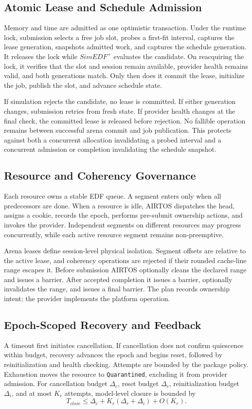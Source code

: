 \documentclass[lettersize,journal]{IEEEtran}
\begin{document}
\subsection{Atomic Lease and Schedule Admission}
Memory and time are admitted as one optimistic transaction. Under the runtime
lock, submission selects a free job slot, probes a first-fit interval, captures
the lease generation, snapshots admitted work, and captures the schedule
generation. It releases the lock while $SimEDF^+$ evaluates the candidate. On
reacquiring the lock, it verifies that the slot and session remain available,
provider health remains valid, and both generations match. Only then does it
commit the lease, initialize the job, publish the slot, and advance schedule
state.

If simulation rejects the candidate, no lease is committed. If either
generation changes, submission retries from fresh state. If provider health
changes at the final check, the committed lease is released before rejection.
No fallible operation remains between successful arena commit and job
publication. This protects against both a concurrent allocation invalidating a
probed interval and a concurrent admission or completion invalidating the
schedule snapshot.

\subsection{Resource and Coherency Governance}
Each resource owns a stable EDF queue. A segment enters only when all
predecessors are done. When a resource is idle, AIRTOS dispatches the head,
assigns a cookie, records the epoch, performs pre-submit ownership actions, and
invokes the provider. Independent segments on different resources may progress
concurrently, while each active resource segment remains non-preemptive.

Arena leases define session-level physical isolation. Segment offsets are
relative to the active lease, and coherency operations are rejected if their
rounded cache-line range escapes it. Before submission AIRTOS optionally cleans
the declared range and issues a barrier. After accepted completion it issues a
barrier, optionally invalidates the range, and issues a final barrier. The plan
records ownership intent; the provider implements the platform operation.

\subsection{Epoch-Scoped Recovery and Feedback}
A timeout first initiates cancellation. If cancellation does not confirm
quiescence within budget, recovery advances the epoch and begins reset,
followed by reinitialization and health checking. Attempts are bounded by the
package policy. Exhaustion moves the resource to \texttt{Quarantined}, excluding
it from provider admission. For cancellation budget $\Delta_c$, reset budget
$\Delta_r$, reinitialization budget $\Delta_i$, and at most $K_r$ attempts,
model-level closure is bounded by
\begin{equation}
T_{close}\le \Delta_c+K_r(\Delta_r+\Delta_i)+O(K_r).
\end{equation}
\end{document}
